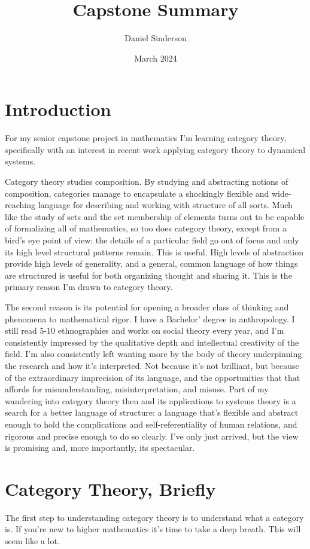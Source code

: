 \documentclass{article}
\title{Capstone Summary}
\author{Daniel Sinderson}
\date{March 2024}
\theoremstyle{definition}
\begin{document}
\maketitle

\section*{Introduction}
For my senior capstone project in mathematics I'm learning category theory,
specifically with an interest in recent work applying category theory to dynamical systems.

Category theory studies composition.
By studying and abstracting notions of composition, categories manage to encapsulate
a shockingly flexible and wide-reaching language for describing and working with structure of all sorts.
Much like the study of sets and the set membership of elements turns out to be capable of formalizing all of mathematics,
so too does category theory, except from a bird's eye point of view:
the details of a particular field go out of focus and only its high level structural patterns remain.
This is useful.
High levels of abstraction provide high levels of generality,
and a general, common language of how things are structured is useful for both organizing thought and sharing it.
This is the primary reason I'm drawn to category theory.

The second reason is its potential for opening a broader class of thinking and phenomena to mathematical rigor.
I have a Bachelor' degree in anthropology.
I still read 5-10 ethnographies and works on social theory every year,
and I'm consistently impressed by the qualitative depth and intellectual creativity of the field.
I'm also consistently left wanting more by the body of theory underpinning the research and how it's interpreted.
Not because it's not brilliant, but because of the extraordinary imprecision of its language,
and the opportunities that that affords for misunderstanding, misinterpretation, and misuse.
Part of my wandering into category theory then and its applications to systems theory
is a search for a better language of structure: a language that's flexible and abstract enough
to hold the complications and self-referentiality of human relations, and rigorous and precise enough
to do so clearly.
I've only just arrived, but the view is promising and, more importantly, its spectacular.


\section*{Category Theory, Briefly}
The first step to understanding category theory is to understand what a category is.
If you're new to higher mathematics it's time to take a deep breath.
This will seem like a lot.
\end{document}
